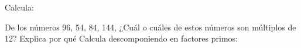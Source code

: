\documentclass[spanish, 11pt]{exam}
\begin{document}
\begin{questions}
\begin{multicols}{2}
\end{multicols}

\question[1\half] Calcula:




    \question[1] De los números 96, 54, 84, 144, ¿Cuál o cuáles de estos números son múltiplos de 12? Explica por qué 
\question[1] Calcula descomponiendo en factores primos:
    \begin{multicols}{2}
    

\end{multicols}
\end{questions}
\end{document}
